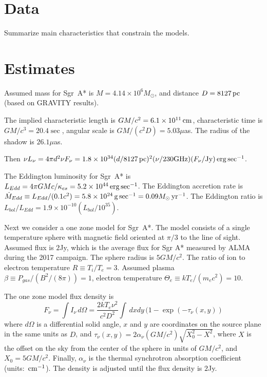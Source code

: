 \documentclass[twocolumn,tighten,dvipsnames]{aastex63}
\newcommand\sgra{Sgr~A*\xspace}
\newcommand\msun{{M_\odot}}
\newcommand\yr{{\rm \, yr}}
\newcommand\erg{{\rm \, erg}}
\newcommand\cm{{\rm \, cm}}
\newcommand\pc{{\rm \, pc}}
\newcommand\gm{{\rm \, g}}
\newcommand\<{{\langle}}
\renewcommand\>{{\rangle}} %
\begin{document}
\section{Data}


Summarize main characteristics that constrain the models.

\section{Estimates}

Assumed mass for \sgra is $M = 4.14 \times 10^6 \msun$, and distance $D = 8127\pc$ (based on GRAVITY results).

The implied characteristic length is $G M/c^2 = 6.1 \times 10^{11} \cm$, characteristic time is $G M/c^3 = 20.4\sec$, angular scale is $G M/(c^2 D) = 5.03\mu$as.  The radius of the shadow is $26.1\mu$as.

Then $\nu L_\nu = 4 \pi d^2 \nu F_\nu = 1.8 \times 10^{34} (d/8127 \pc)^2 (\nu/230 {\rm GHz})(F_\nu/{\rm Jy}) \erg \sec^{-1}$.

The Eddington luminosity for \sgra is $L_{Edd} = 4\pi G M c/\kappa_{es} = 5.2 \times 10^{44} \erg\sec^{-1}$. The Eddington accretion rate is $\dot{M}_{Edd} \equiv  L_{Edd}/(0.1 c^2) = 5.8 \times 10^{24} \gm \sec^{-1} = 0.09 \msun \yr^{-1}$.  The Eddington ratio is $L_{bol}/L_{Edd} = 1.9 \times 10^{-10} (L_{bol}/10^{35})$.

Next we consider a one zone model for \sgra.  The model consists of a single temperature sphere with magnetic field oriented at $\pi/3$ to the line of sight.  Assumed flux is $2$Jy, which is the average flux for Sgr A* measured by ALMA during the 2017 campaign.  The sphere radius is $5 G M/c^2$.  The ratio of ion to electron temperature $R \equiv T_i/T_e = 3$.  Assumed plasma $\beta \equiv  P_{gas}/(B^2/(8\pi)) = 1$, electron temperature $\Theta_e \equiv k T_e/(m_e c^2) = 10$.

The one zone model flux density is
\begin{equation}
    F_\nu = \int I_\nu \, d\Omega = \frac{2 k T_e \nu^2}{c^2 D^2} \int \, dx dy\,  (1 - \exp(-\tau_\nu(x,y))
\end{equation}
where $d\Omega$ is a differential solid angle, $x$ and $y$ are coordinates on the source plane in the same units as $D$, and $\tau_\nu(x,y) = 2 \alpha_\nu (G M/c^2) \sqrt{X_0^2 - X^2}$, where $X$ is the offset on the sky from the center of the sphere in units of $GM/c^2$, and $X_0 = 5 G M/c^2$.  Finally, $\alpha_\nu$ is the thermal synchrotron absorption coefficient (units: $\cm^{-1}$).  The density is adjusted until the flux density is $2$Jy.
\end{document}
